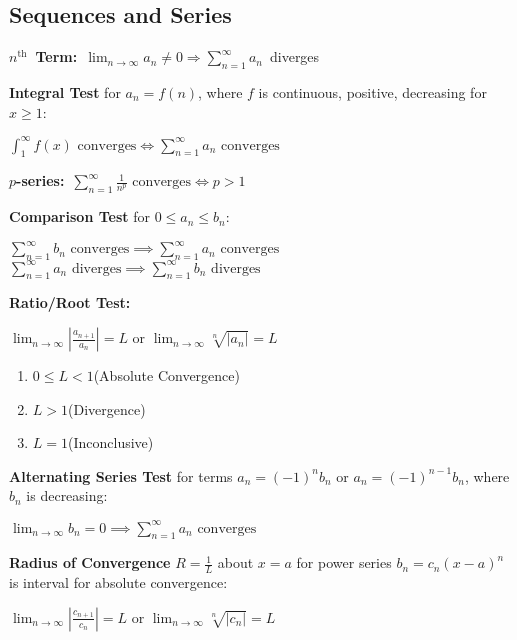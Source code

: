 \documentclass[12pt, a4paper]{article}
\begin{document}
\begin{multicols*}{4}
\section{Sequences and Series}

\mbox{\textbf{$n^{\text{th}}$ Term:} $\displaystyle\lim_{n\rightarrow\infty} a_n\neq 0 \Rightarrow \sum^{\infty}_{n=1}a_n$ diverges}

\textbf{Integral Test} for $a_n = f(n)$, where $f$ is continuous, positive, decreasing for $x \geq 1$:\\
{\centering
  $\displaystyle \int^{\infty}_1 f(x)\text{ converges} \iff \sum^{\infty}_{n=1}a_n\text{ converges}$
\par}

\mbox{\textbf{$p$-series:} $\displaystyle \sum^{\infty}_{n=1} \frac{1}{n^p}\text{ converges} \iff p > 1$}

\textbf{Comparison Test} for $0 \leq a_n \leq b_n$:\\
{\centering
  $\displaystyle \sum^{\infty}_{n=1}b_n\text{ converges}\implies\sum^{\infty}_{n=1}a_n\text{ converges}$
   $\displaystyle \sum^{\infty}_{n=1}a_n\text{ diverges}\implies\sum^{\infty}_{n=1}b_n\text{ diverges}$
\par}

\textbf{Ratio/Root Test:}\\
{\centering
  $\displaystyle \lim_{n\rightarrow\infty}\left|\frac{a_{n+1}}{a_n}\right| = L\text{ or }\lim_{n\rightarrow\infty}\sqrt[n]{|a_n|}=L$
\par}
\begin{enumerate}[\roman*.]
  \item $0\leq L<1$\hfill(Absolute Convergence)
  \item $L>1$\hfill(Divergence)
  \item $L=1$\hfill(Inconclusive)
\end{enumerate}

\textbf{Alternating Series Test} for terms $a_n = (-1)^{n}b_n$ or $a_n = (-1)^{n-1}b_n$, where $b_n$ is decreasing:\\
{\centering
  $\displaystyle\lim_{n\rightarrow\infty}b_n=0 \implies \sum^{\infty}_{n=1}a_n\text{ converges}$
\par}

\textbf{Radius of Convergence} $R=\frac{1}{L}$ about $x=a$ for power series $b_n = c_n(x-a)^n$ is interval for absolute convergence:\\
{\centering
  $\displaystyle \lim_{n\rightarrow\infty}\left|\frac{c_{n+1}}{c_n}\right| = L\text{ or }\lim_{n\rightarrow\infty}\sqrt[n]{|c_n|}=L$
\par}


\end{multicols*}
\end{document}
